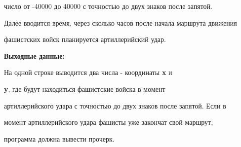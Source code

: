\begin{question}
число от -40000 до 40000 с точностью до двух знаков после запятой.



Далее вводится время, через сколько часов после начала маршрута движения

фашистских войск планируется артиллерийский удар.



\textbf{Выходные данные:}



На одной строке выводится два числа - координаты \textbf{x} и

\textbf{y}, где будут находиться фашистские войска в момент

артиллерийского удара с точностью до двух знаков после запятой. Если в

момент артиллерийского удара фашисты уже закончат свой маршрут,

программа должна вывести прочерк.


\end{question}
